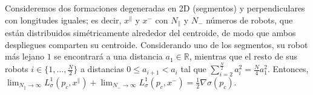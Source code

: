 \vspace{0.2cm}

\begin{prop} 
\label{prop: cross}
Consideremos dos formaciones degeneradas en 2D (segmentos) y perpendiculares con longitudes iguales; es decir, $x^\parallel$ y $x^-$ con $N_\parallel$ y $N_-$ números de robots, que están distribuidos simétricamente alrededor del centroide, de modo que ambos despliegues comparten su centroide. Considerando uno de los segmentos, su robot más lejano $1$ se encontrará a una distancia $a_1 \in \mathbb{R}$, mientras que el resto de sus robots $i\in\{1, \dots, \frac{N}{2}\}$ a distancias $0 \leq a_{i+1} < a_i$ tal que $\sum_{i=2}^{\frac{N}{2}}a_i^2 = \frac{N}{4}a_1^2$. Entonces, $\lim_{N_\parallel\to\infty} L^1_\sigma(p_c, x^\parallel) + \lim_{N_-\to\infty} L^1_\sigma(p_c, x^-) = \frac{1}{2}\nabla\sigma(p_c)$.
\end{prop}

